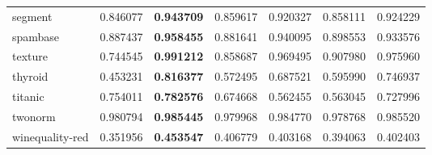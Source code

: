 \begin{tabular}{lrrrrrr}
segment         &         0.846077 &  \textbf{0.943709} &                  0.859617 &       0.920327 &                  0.858111 &       0.924229 \\
spambase        &         0.887437 &  \textbf{0.958455} &                  0.881641 &       0.940095 &                  0.898553 &       0.933576 \\
texture         &         0.744545 &  \textbf{0.991212} &                  0.858687 &       0.969495 &                  0.907980 &       0.975960 \\
thyroid         &         0.453231 &  \textbf{0.816377} &                  0.572495 &       0.687521 &                  0.595990 &       0.746937 \\
titanic         &         0.754011 &  \textbf{0.782576} &                  0.674668 &       0.562455 &                  0.563045 &       0.727996 \\
twonorm         &         0.980794 &  \textbf{0.985445} &                  0.979968 &       0.984770 &                  0.978768 &       0.985520 \\
winequality-red &         0.351956 &  \textbf{0.453547} &                  0.406779 &       0.403168 &                  0.394063 &       0.402403 \\
\bottomrule
\end{tabular}
